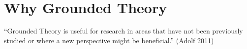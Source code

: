 
\section{Why Grounded Theory}
“Grounded Theory is useful for research in areas that have not been previously studied or where a new perspective might be beneficial.” (Adolf 2011)

